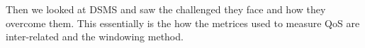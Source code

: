 Then we looked at DSMS and saw the challenged they face and how they overcome them. This essentially is the how the metrices used to measure QoS are inter-related and the windowing method.



\begin{comment}

\section{System R}
\label{sec:systemR}
\section{Deep Reinforcement learning}
\label{sec:drl}


The performance of the agent is measured using the rewards collected along the way through various states. So the objective of an MDP is to find a policy $\pi:S\rightarrow A$, a function that maps states to actions, in order to maximize the expected value:-
\begin{center}
    \[ 
    \argmax_{\pi} \mathbb{E} \left[ \sum^{T-1}_{t=0}R(s_{t},a_{t})  \right]
    \] 
    subject to $s_{t+1} = P(s_{t},a_{t}), a_{t} = \pi{s_{t}}$
\end{center}
This method does not reduce the search space, and unlikely greedy solution, this will lead to an optimal solution. This method does not reduce the search space, and unlikely greedy solution, this will lead to an optimal solution.
\par Reinforcement learning(RL) is a technique which optimizes MDPs iteratively, by running a simulation in each iteration and changing the policy to find an optimal one based on the cumulative reward.

\end{comment}
